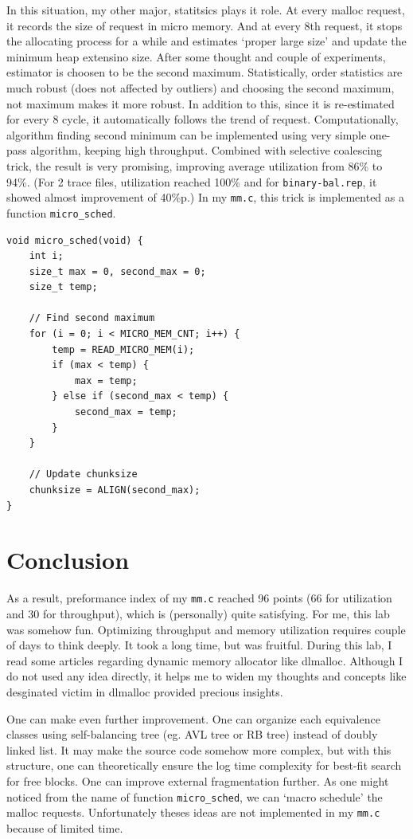 \documentclass[fleqn]{article}
\begin{document}
In this situation, my other major, statitsics plays it role. At every malloc request, it records the size of request in micro memory. And at every 8th request, it stops the allocating process for a while and estimates `proper large size' and update the minimum heap extensino size. After some thought and couple of experiments, estimator is choosen to be the second maximum. Statistically, order statistics are much robust (does not affected by outliers) and choosing the second maximum, not maximum makes it more robust. In addition to this, since it is re-estimated for every 8 cycle, it automatically follows the trend of request. Computationally, algorithm finding second minimum can be implemented using very simple one-pass algorithm, keeping high throughput. Combined with selective coalescing trick, the result is very promising, improving average utilization from 86\% to 94\%. (For 2 trace files, utilization reached 100\% and for \texttt{binary-bal.rep}, it showed almost improvement of 40\%p.) In my \texttt{mm.c}, this trick is implemented as a function \texttt{micro\_sched}.

\small
\begin{verbatim}
void micro_sched(void) {
    int i;
    size_t max = 0, second_max = 0;
    size_t temp;

    // Find second maximum
    for (i = 0; i < MICRO_MEM_CNT; i++) {
        temp = READ_MICRO_MEM(i);
        if (max < temp) {
            max = temp;
        } else if (second_max < temp) {
            second_max = temp;
        }
    }

    // Update chunksize
    chunksize = ALIGN(second_max);
}
\end{verbatim}
\normalsize

\section{Conclusion}

As a result, preformance index of my \texttt{mm.c} reached 96 points (66 for utilization and 30 for throughput), which is (personally) quite satisfying. For me, this lab was somehow fun. Optimizing throughput and memory utilization requires couple of days to think deeply. It took a long time, but was fruitful. During this lab, I read some articles regarding dynamic memory allocator like dlmalloc. Although I do not used any idea directly, it helps me to widen my thoughts and concepts like desginated victim in dlmalloc provided precious insights.

One can make even further improvement. One can organize each equivalence classes using self-balancing tree (eg. AVL tree or RB tree) instead of doubly linked list. It may make the source code somehow more complex, but with this structure, one can theoretically ensure the log time complexity for best-fit search for free blocks. One can improve external fragmentation further. As one might noticed from the name of function \texttt{micro\_sched}, we can `macro schedule' the malloc requests. Unfortunately theses ideas are not implemented in my \texttt{mm.c} because of limited time.
\end{document}
